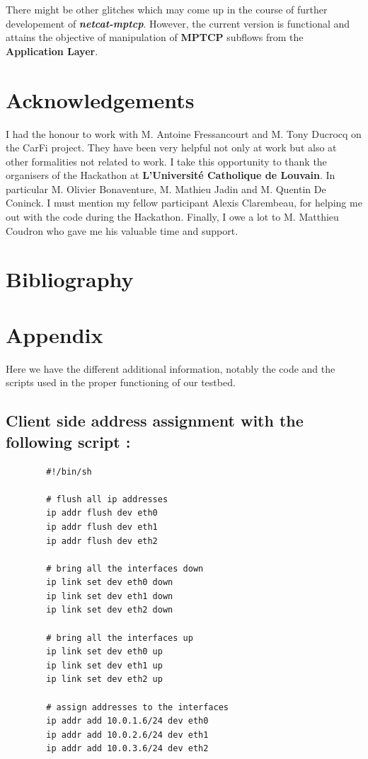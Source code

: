 \documentclass[a4paper,11pt]{article}
\begin{document}
		There might be other glitches which may come up in the course of further developement of \textbf{\emph{netcat-mptcp}}. However, the current version is functional and attains the objective of manipulation of \textbf{MPTCP} subflows from the \textbf{Application Layer}.
			
		 	
		 	
	\clearpage
	\section{Acknowledgements}
	 
	  	I had the honour to work with M. Antoine Fressancourt and M. Tony Ducrocq on the CarFi project. They have been very helpful not only at work but also at other formalities not related to work. I take this opportunity to thank the organisers of the Hackathon at \textbf{L'Université Catholique de Louvain}. In particular M. Olivier Bonaventure, M. Mathieu Jadin and M. Quentin De Coninck. I must mention my fellow participant Alexis Clarembeau, for helping me out with the code during the Hackathon. Finally, I owe a lot to M. Matthieu Coudron who gave me his valuable time and support.
		 
 	\vspace*{2cm}
 	\section{Bibliography}
		
		


	\clearpage
	\section{Appendix}
		\label{sec:appendix}
	 	Here we have the different additional information, notably the code and the scripts used in the proper functioning of our testbed.

	 	\subsection{Client side address assignment with the following script :}
	 	\label{subsec:clientaddress}
	 	\begin{lstlisting}
	 	#!/bin/sh

	 	# flush all ip addresses
	 	ip addr flush dev eth0
	 	ip addr flush dev eth1
	 	ip addr flush dev eth2

	 	# bring all the interfaces down
	 	ip link set dev eth0 down
	 	ip link set dev eth1 down
	 	ip link set dev eth2 down

	 	# bring all the interfaces up
	 	ip link set dev eth0 up
	 	ip link set dev eth1 up
	 	ip link set dev eth2 up

	 	# assign addresses to the interfaces
	 	ip addr add 10.0.1.6/24 dev eth0
	 	ip addr add 10.0.2.6/24 dev eth1
	 	ip addr add 10.0.3.6/24 dev eth2
	 	\end{lstlisting}
\end{document}
